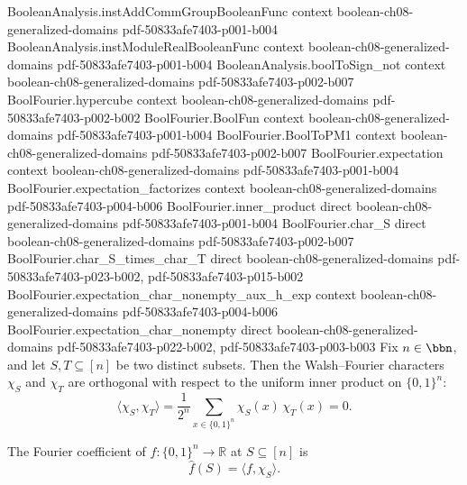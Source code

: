 \begin{lemma}
\proofstep
  {BooleanAnalysis.instAddCommGroupBooleanFunc}
  {context}
  {boolean-ch08-generalized-domains}
  {pdf-50833afe7403-p001-b004}
\proofstep
  {BooleanAnalysis.instModuleRealBooleanFunc}
  {context}
  {boolean-ch08-generalized-domains}
  {pdf-50833afe7403-p001-b004}
\proofstep
  {BooleanAnalysis.boolToSign_not}
  {context}
  {boolean-ch08-generalized-domains}
  {pdf-50833afe7403-p002-b007}
\proofstep
  {BoolFourier.hypercube}
  {context}
  {boolean-ch08-generalized-domains}
  {pdf-50833afe7403-p002-b002}
\proofstep
  {BoolFourier.BoolFun}
  {context}
  {boolean-ch08-generalized-domains}
  {pdf-50833afe7403-p001-b004}
\proofstep
  {BoolFourier.BoolToPM1}
  {context}
  {boolean-ch08-generalized-domains}
  {pdf-50833afe7403-p002-b007}
\proofstep
  {BoolFourier.expectation}
  {context}
  {boolean-ch08-generalized-domains}
  {pdf-50833afe7403-p001-b004}
\proofstep
  {BoolFourier.expectation_factorizes}
  {context}
  {boolean-ch08-generalized-domains}
  {pdf-50833afe7403-p004-b006}
\proofstep
  {BoolFourier.inner_product}
  {direct}
  {boolean-ch08-generalized-domains}
  {pdf-50833afe7403-p001-b004}
\proofstep
  {BoolFourier.char_S}
  {direct}
  {boolean-ch08-generalized-domains}
  {pdf-50833afe7403-p002-b007}
\proofstep
  {BoolFourier.char_S_times_char_T}
  {direct}
  {boolean-ch08-generalized-domains}
  {pdf-50833afe7403-p023-b002,
    pdf-50833afe7403-p015-b002}
\proofstep
  {BoolFourier.expectation_char_nonempty_aux_h_exp}
  {context}
  {boolean-ch08-generalized-domains}
  {pdf-50833afe7403-p004-b006}
\proofstep
  {BoolFourier.expectation_char_nonempty}
  {direct}
  {boolean-ch08-generalized-domains}
  {pdf-50833afe7403-p022-b002,
    pdf-50833afe7403-p003-b003}
Fix $n \in \bbn$, and let $S, T \subseteq [n]$ be two distinct subsets. Then the
Walsh--Fourier characters $\chi_S$ and $\chi_T$ are orthogonal with respect to the
uniform inner product on $\{0,1\}^n$:
\[
\langle \chi_S, \chi_T \rangle = \frac{1}{2^n}\sum_{x \in \{0,1\}^n}
\chi_S(x)\,\chi_T(x) = 0.
\]
\end{lemma}

\begin{definition}
\label{BoolFourier.fourier_coeff}
\leanok
{}
The Fourier coefficient of $f : \{0,1\}^n \to \mathbb{R}$ at $S \subseteq [n]$ is
\[
  \hat f(S) = \langle f, \chi_S \rangle.
\]
\end{definition}

